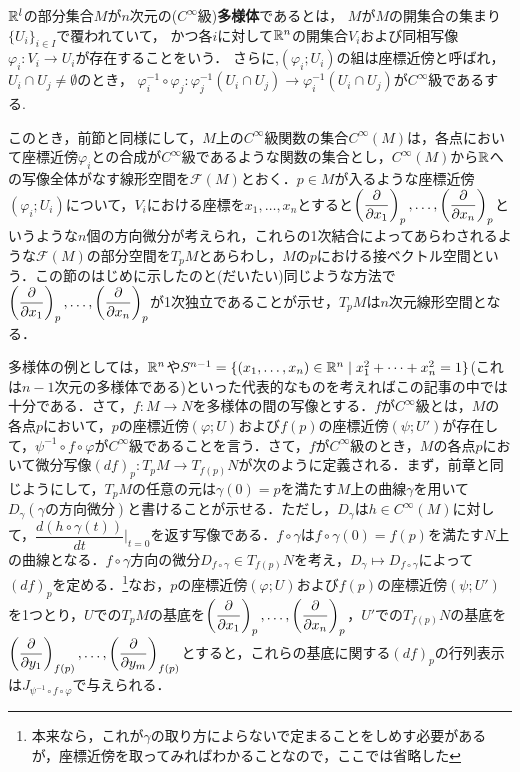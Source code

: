 \begin{s_defi}
${\mathbb R}^l$の部分集合$M$が$n$次元の($C^\infty$級)\textbf{多様体}であるとは，
$M$が$M$の開集合の集まり$\{U_i\}_{i\in I}$で覆われていて，
かつ各$i$に対して${\mathbb R}^n$の開集合$V_i$および同相写像$\varphi_i:V_i\rightarrow U_i$が存在することをいう．
さらに,$(\varphi_i;U_i)$の組は座標近傍と呼ばれ，
$U_i\cap U_j\neq \emptyset$のとき，
$\varphi_i^{-1}\circ\varphi_j:\varphi_j^{-1}(U_i\cap U_j)\rightarrow\varphi_i^{-1}(U_i\cap U_j)$が$C^{\infty}$級であるする.
\end{s_defi}



このとき，前節と同様にして，$M$上の$C^{\infty}$級関数の集合$C^{\infty}(M)$は，各点において座標近傍$\varphi_i$との合成が$C^{\infty}$級であるような関数の集合とし，$C^{\infty}(M)$から${\mathbb R}$への写像全体がなす線形空間を${\mathcal F}(M)$とおく．$p\in M$が入るような座標近傍$(\varphi_i;U_i)$について，$V_i$における座標を$x_1,\dots,x_n$とすると$\left(\dfrac{\partial}{\partial x_1}\right)_p,\dots,\left(\dfrac{\partial}{\partial x_n}\right)_p$というような$n$個の方向微分が考えられ，これらの1次結合によってあらわされるような${\mathcal F}(M)$の部分空間を$T_pM$とあらわし，$M$の$p$における接ベクトル空間という．この節のはじめに示したのと(だいたい)同じような方法で$\left(\dfrac{\partial}{\partial x_1}\right)_p,\dots,\left(\dfrac{\partial}{\partial x_n}\right)_p$が1次独立であることが示せ，$T_pM$は$n$次元線形空間となる．\par


多様体の例としては，${\mathbb R}^n$や$S^{n-1}=\{(x_1,\dots,x_n)\in{\mathbb R}^n\mid x_1^2+\dots+x_n^2=1\}$(これは$n-1$次元の多様体である)といった代表的なものを考えればこの記事の中では十分である．さて，$f:M\rightarrow N$を多様体の間の写像とする．$f$が$C^{\infty}$級とは，$M$の各点$p$において，$p$の座標近傍$(\varphi;U)$および$f(p)$の座標近傍$(\psi;U')$が存在して，$\psi^{-1}\circ f\circ\varphi$が$C^{\infty}$級であることを言う．さて，$f$が$C^{\infty}$級のとき，$M$の各点$p$において微分写像$(df)_p:T_pM\rightarrow T_{f(p)}N$が次のように定義される．まず，前章と同じようにして，$T_pM$の任意の元は$\gamma(0)=p$を満たす$M$上の曲線$\gamma$を用いて$D_\gamma(\gamma の方向微分)$と書けることが示せる．ただし，$D_\gamma$は$h\in C^\infty(M)$に対して，$\dfrac{d(h\circ\gamma(t))}{dt}\Big|_{t=0}$を返す写像である．$f\circ\gamma$は$f\circ\gamma(0)=f(p)$を満たす$N$上の曲線となる．$f\circ\gamma$方向の微分$D_{f\circ\gamma}\in T_{f(p)}N$を考え，$D_{\gamma}\mapsto D_{f\circ\gamma}$によって$(df)_p$を定める．\footnote{本来なら，これが$\gamma$の取り方によらないで定まることをしめす必要があるが，座標近傍を取ってみればわかることなので，ここでは省略した}なお，$p$の座標近傍$(\varphi;U)$および$f(p)$の座標近傍$(\psi;U')$を1つとり，$U$での$T_pM$の基底を$\left(\dfrac{\partial}{\partial x_1}\right)_p,\dots,\left(\dfrac{\partial}{\partial x_n}\right)_p$，$U'$での$T_{f(p)}N$の基底を$\left(\dfrac{\partial}{\partial y_1}\right)_{f(p)},\dots,\left(\dfrac{\partial}{\partial y_m}\right)_{f(p)}$とすると，これらの基底に関する$(df)_p$の行列表示は$J_{\psi^{-1}\circ f\circ\varphi}$で与えられる．


